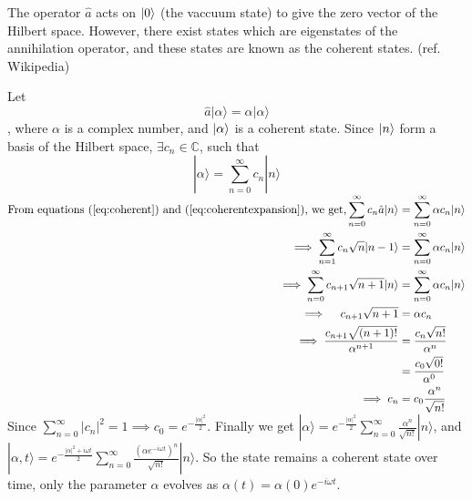 \documentclass[12pt, twoside]{article}
\begin{document}
The operator $\hat{a}$ acts on $\ket{0}$ (the vaccuum state) to give the zero vector of the Hilbert space. However, there exist states which are eigenstates of the annihilation operator, and these states are known as the coherent states. (ref. Wikipedia)

Let \begin{equation}\label{eq:coherent}
	\hat {a} | \alpha \rangle = \alpha | \alpha \rangle
\end{equation}, where $\alpha$ is a complex number, and $\ket{\alpha}$ is a coherent state. Since $\ket{n}$ form a basis of the Hilbert space, $\exists c_n \in \mathbb{C}$, such that \begin{equation} \label{eq:coherentexpansion}| \alpha \rangle = \displaystyle\sum _ { n = 0 } ^ { \infty } c_n | n \rangle \end{equation}
$\begin{aligned}\text{From equations (\ref{eq:coherent}) and (\ref{eq:coherentexpansion}), we get,}\displaystyle\sum _ { n = 0 } ^ { \infty } c_ { n } \hat {a} | n \rangle &= \sum _ { n = 0 } ^ { \infty } \alpha c_{ n } | n \rangle\\\implies \sum _ { n = 1 } ^ { \infty } c_{ n } \sqrt { n } | n - 1 \rangle &= \sum _ { n = 0 } ^ { \infty } \alpha c_{ n } | n \rangle \\ \implies \sum _ { n = 0 } ^ { \infty } c _ { n + 1 } \sqrt { n + 1 } | n \rangle &= \sum _ { n = 0 } ^ { \infty } \alpha c _ { n } | n \rangle\\ \implies \quad c _ { n + 1 } \sqrt { n + 1 } &= \alpha c _ { n } \\  \implies \frac { c _ { n + 1 } \sqrt { ( n + 1 ) ! } } { \alpha ^ { n + 1 } }  &= \frac { c _ { n } \sqrt { n ! } } { \alpha ^ { n } } \\  &= \frac { c _ { 0 } \sqrt { 0 ! } } { \alpha ^ { 0 } }  \\ \implies c _ { n } &= c _ { 0 } \frac { \alpha ^ { n } } { \sqrt { n ! } }\end{aligned}$\\
Since $\displaystyle\sum _ { n = 0 } ^ { \infty } \left| c _ { n } \right| ^ { 2 } = 1 \implies c _ { 0 } = e ^ { - \frac { | \alpha | ^ { 2 } } { 2 } }$. Finally we get $\displaystyle| \alpha \rangle = e ^ { - \frac {|\alpha| ^ { 2 } } { 2 } } \sum _ { n = 0 } ^ { \infty } \frac { \alpha ^ { n } } { \sqrt { n ! } } | n \rangle$,
and $\displaystyle| \alpha,t \rangle = e ^ { - \frac {|\alpha| ^ { 2 } + i\omega t} { 2 }} \sum _ { n = 0 } ^ { \infty } \frac { (\alpha e^{-i\omega t})^ { n }  } { \sqrt { n ! } } | n \rangle$. So the state remains a coherent state over time, only the parameter $\alpha$ evolves as $\alpha(t) = \alpha(0) e^{-i\omega t}$.
\end{document}
